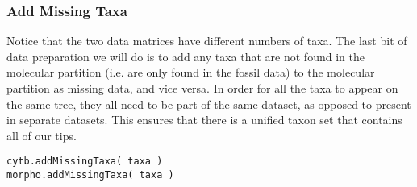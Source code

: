 \medskip
\subsubsection{Add Missing Taxa}\label{subsub:RB-AddMissing}

Notice that the two data matrices have different numbers of taxa. The last bit of data preparation we will do is to add any taxa that are not found in the molecular partition (i.e. are only found in the fossil data) to the molecular partition as missing data, and vice versa.
In order for all the taxa to appear on the same tree, they all need to be part of the same dataset, as opposed to present in separate datasets. 
This ensures that there is a unified taxon set that contains all of our tips.

{\tt \begin{snugshade*}
\begin{lstlisting}
cytb.addMissingTaxa( taxa )
morpho.addMissingTaxa( taxa )
\end{lstlisting}
\end{snugshade*}}

%
%
%
%
%
%
%

